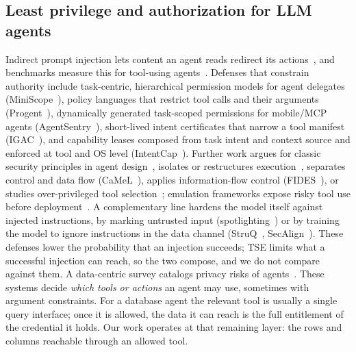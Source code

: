 \subsection{Least privilege and authorization for LLM agents}
Indirect prompt injection lets content an agent reads redirect its actions~\cite{greshake2023not}, and
benchmarks measure this for tool-using agents~\cite{debenedetti2024agentdojo,zhan2024injecagent,zhang2025asb,liu2024formalizing}.
Defenses that constrain authority include task-centric, hierarchical permission models for agent
delegates (MiniScope~\cite{zhu2025miniscope}), policy languages that restrict tool calls and their
arguments (Progent~\cite{shi2025progent}), dynamically generated task-scoped permissions for mobile/MCP
agents (AgentSentry~\cite{cai2025agentsentry}), short-lived intent certificates that narrow a tool
manifest (IGAC~\cite{zhu2026igac}), and capability leases composed from task intent and context source and
enforced at tool and OS level (IntentCap~\cite{zheng2026intentcap}). Further work argues for classic
security principles in agent design~\cite{zhang2025principles,li2025vision,sharma2026ac4a,surapani2026authz},
isolates or restructures execution~\cite{wu2025isolategpt,kim2025pfi}, separates control and data flow
(CaMeL~\cite{debenedetti2026camel}), applies information-flow control (FIDES~\cite{costa2025fides}), or
studies over-privileged tool selection~\cite{yang2026lowerpriv}; emulation frameworks expose risky tool use
before deployment~\cite{ruan2024toolemu}. A complementary line hardens the model itself against injected
instructions, by marking untrusted input (spotlighting~\cite{hines2024spotlighting}) or by training the model to
ignore instructions in the data channel (StruQ~\cite{chen2025struq}, SecAlign~\cite{chen2025secalign}). These
defenses lower the probability that an injection succeeds; TSE limits what a successful injection can reach, so the
two compose, and we do not compare against them. A data-centric survey catalogs privacy
risks of agents~\cite{lahjouji2026know}. These systems decide \emph{which tools or actions} an agent may
use, sometimes with argument constraints. For a database agent the relevant tool is usually a single
query interface; once it is allowed, the data it can reach is the full entitlement of the credential it
holds. Our work operates at that remaining layer: the rows and columns reachable through an allowed tool.

